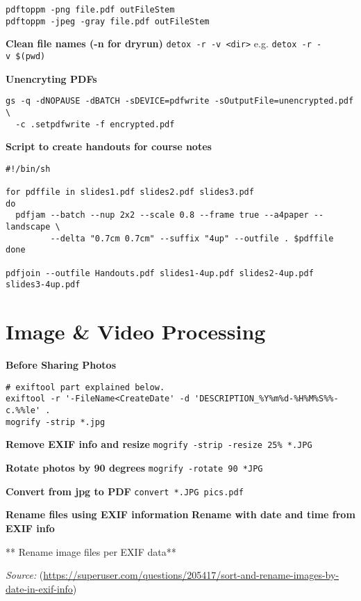 \documentclass[]{book}
\theoremstyle{definition}
\theoremstyle{definition}
\theoremstyle{definition}
\theoremstyle{remark}
\begin{document}
\begin{verbatim}
pdftoppm -png file.pdf outFileStem
pdftoppm -jpeg -gray file.pdf outFileStem
\end{verbatim}

\textbf{Clean file names (-n for dryrun)}
\texttt{detox\ -r\ -v\ \textless{}dir\textgreater{}} e.g.
\texttt{detox\ -r\ -v\ \$(pwd)}

\textbf{Unencryting PDFs}

\begin{verbatim}
gs -q -dNOPAUSE -dBATCH -sDEVICE=pdfwrite -sOutputFile=unencrypted.pdf \
  -c .setpdfwrite -f encrypted.pdf
\end{verbatim}

\textbf{Script to create handouts for course notes}

\begin{verbatim}
#!/bin/sh

for pdffile in slides1.pdf slides2.pdf slides3.pdf     
do  
  pdfjam --batch --nup 2x2 --scale 0.8 --frame true --a4paper --landscape \
         --delta "0.7cm 0.7cm" --suffix "4up" --outfile . $pdffile
done     

pdfjoin --outfile Handouts.pdf slides1-4up.pdf slides2-4up.pdf slides3-4up.pdf
\end{verbatim}

\section{Image \& Video Processing}\label{image-video-processing}

\textbf{Before Sharing Photos}

\begin{verbatim}
# exiftool part explained below.
exiftool -r '-FileName<CreateDate' -d 'DESCRIPTION_%Y%m%d-%H%M%S%%-c.%%le' .
mogrify -strip *.jpg
\end{verbatim}

\textbf{Remove EXIF info and resize}
\texttt{mogrify\ -strip\ -resize\ 25\%\ *.JPG}

\textbf{Rotate photos by 90 degrees} \texttt{mogrify\ -rotate\ 90\ *JPG}

\textbf{Convert from jpg to PDF} \texttt{convert\ *.JPG\ pics.pdf}

\textbf{Rename files using EXIF information} \textbf{Rename with date
and time from EXIF info}

** Rename image files per EXIF data**

\emph{Source:}
(\url{https://superuser.com/questions/205417/sort-and-rename-images-by-date-in-exif-info})
\end{document}

